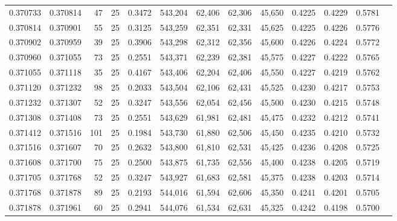 \begin{tabular}{rrrrrrrrrrrrr}
0.370733 & 0.370814 &    47 &  25 &                                     0.3472 & 543,204 &  62,406 &  62,306 &  45,650 & 0.4225 & 0.4229 & 0.5781 \\
0.370814 & 0.370901 &    55 &  25 &                                     0.3125 & 543,259 &  62,351 &  62,331 &  45,625 & 0.4225 & 0.4226 & 0.5776 \\
0.370902 & 0.370959 &    39 &  25 &                                     0.3906 & 543,298 &  62,312 &  62,356 &  45,600 & 0.4226 & 0.4224 & 0.5772 \\
0.370960 & 0.371055 &    73 &  25 &                                     0.2551 & 543,371 &  62,239 &  62,381 &  45,575 & 0.4227 & 0.4222 & 0.5765 \\
0.371055 & 0.371118 &    35 &  25 &                                     0.4167 & 543,406 &  62,204 &  62,406 &  45,550 & 0.4227 & 0.4219 & 0.5762 \\
0.371120 & 0.371232 &    98 &  25 &                                     0.2033 & 543,504 &  62,106 &  62,431 &  45,525 & 0.4230 & 0.4217 & 0.5753 \\
0.371232 & 0.371307 &    52 &  25 &                                     0.3247 & 543,556 &  62,054 &  62,456 &  45,500 & 0.4230 & 0.4215 & 0.5748 \\
0.371308 & 0.371408 &    73 &  25 &                                     0.2551 & 543,629 &  61,981 &  62,481 &  45,475 & 0.4232 & 0.4212 & 0.5741 \\
0.371412 & 0.371516 &   101 &  25 &                                     0.1984 & 543,730 &  61,880 &  62,506 &  45,450 & 0.4235 & 0.4210 & 0.5732 \\
0.371516 & 0.371607 &    70 &  25 &                                     0.2632 & 543,800 &  61,810 &  62,531 &  45,425 & 0.4236 & 0.4208 & 0.5725 \\
0.371608 & 0.371700 &    75 &  25 &                                     0.2500 & 543,875 &  61,735 &  62,556 &  45,400 & 0.4238 & 0.4205 & 0.5719 \\
0.371705 & 0.371768 &    52 &  25 &                                     0.3247 & 543,927 &  61,683 &  62,581 &  45,375 & 0.4238 & 0.4203 & 0.5714 \\
0.371768 & 0.371878 &    89 &  25 &                                     0.2193 & 544,016 &  61,594 &  62,606 &  45,350 & 0.4241 & 0.4201 & 0.5705 \\
0.371878 & 0.371961 &    60 &  25 &                                     0.2941 & 544,076 &  61,534 &  62,631 &  45,325 & 0.4242 & 0.4198 & 0.5700 \\

\end{tabular}
